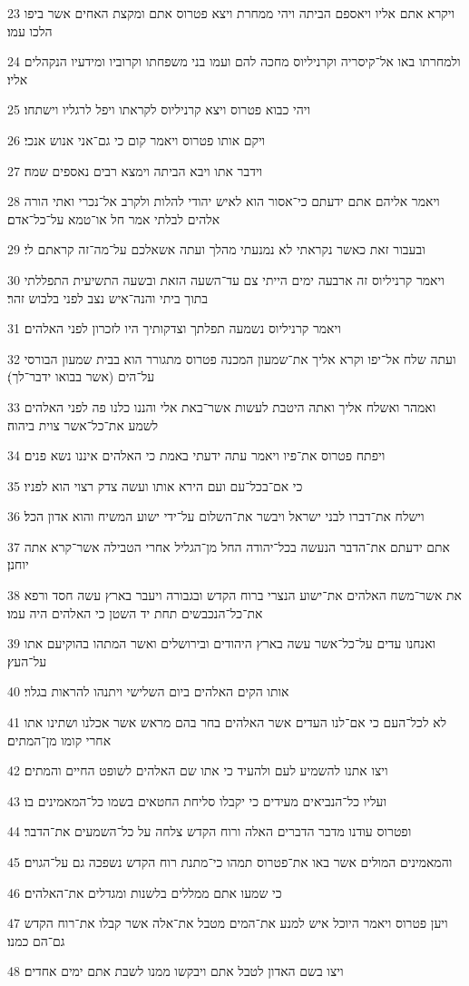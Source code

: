 \par 23 ויקרא אתם אליו ויאספם הביתה ויהי ממחרת ויצא פטרוס אתם ומקצת האחים אשר ביפו הלכו עמו׃
\par 24 ולמחרתו באו אל־קיסריה וקרניליוס מחכה להם ועמו בני משפחתו וקרוביו ומידעיו הנקהלים אליו׃
\par 25 ויהי כבוא פטרוס ויצא קרניליוס לקראתו ויפל לרגליו וישתחו׃
\par 26 ויקם אותו פטרוס ויאמר קום כי גם־אני אנוש אנכי׃
\par 27 וידבר אתו ויבא הביתה וימצא רבים נאספים שמה׃
\par 28 ויאמר אליהם אתם ידעתם כי־אסור הוא לאיש יהודי להלות ולקרב אל־נכרי ואתי הורה אלהים לבלתי אמר חל או־טמא על־כל־אדם׃
\par 29 ובעבור זאת כאשר נקראתי לא נמנעתי מהלך ועתה אשאלכם על־מה־זה קראתם לי׃
\par 30 ויאמר קרניליוס זה ארבעה ימים הייתי צם עד־השעה הזאת ובשעה התשיעית התפללתי בתוך ביתי והנה־איש נצב לפני בלבוש זהר׃
\par 31 ויאמר קרניליוס נשמעה תפלתך וצדקותיך היו לזכרון לפני האלהים׃
\par 32 ועתה שלח אל־יפו וקרא אליך את־שמעון המכנה פטרוס מתגורר הוא בבית שמעון הבורסי על־הים (אשר בבואו ידבר־לך)׃
\par 33 ואמהר ואשלח אליך ואתה היטבת לעשות אשר־באת אלי והננו כלנו פה לפני האלהים לשמע את־כל־אשר צוית ביהוה׃
\par 34 ויפתח פטרוס את־פיו ויאמר עתה ידעתי באמת כי האלהים איננו נשא פנים׃
\par 35 כי אם־בכל־עם ועם הירא אותו ועשה צדק רצוי הוא לפניו׃
\par 36 וישלח את־דברו לבני ישראל ויבשר את־השלום על־ידי ישוע המשיח והוא אדון הכל׃
\par 37 אתם ידעתם את־הדבר הנעשה בכל־יהודה החל מן־הגליל אחרי הטבילה אשר־קרא אתה יוחנן׃
\par 38 את אשר־משח האלהים את־ישוע הנצרי ברוח הקדש ובגבורה ויעבר בארץ עשה חסד ורפא את־כל־הנכבשים תחת יד השטן כי האלהים היה עמו׃
\par 39 ואנחנו עדים על־כל־אשר עשה בארץ היהודים ובירושלים ואשר המתהו בהוקיעם אתו על־העץ׃
\par 40 אותו הקים האלהים ביום השלישי ויתנהו להראות בגלוי׃
\par 41 לא לכל־העם כי אם־לנו העדים אשר האלהים בחר בהם מראש אשר אכלנו ושתינו אתו אחרי קומו מן־המתים׃
\par 42 ויצו אתנו להשמיע לעם ולהעיד כי אתו שם האלהים לשופט החיים והמתים׃
\par 43 ועליו כל־הנביאים מעידים כי יקבלו סליחת החטאים בשמו כל־המאמינים בו׃
\par 44 ופטרוס עודנו מדבר הדברים האלה ורוח הקדש צלחה על כל־השמעים את־הדבר׃
\par 45 והמאמינים המולים אשר באו את־פטרוס תמהו כי־מתנת רוח הקדש נשפכה גם על־הגוים׃
\par 46 כי שמעו אתם ממללים בלשנות ומגדלים את־האלהים׃
\par 47 ויען פטרוס ויאמר היוכל איש למנע את־המים מטבל את־אלה אשר קבלו את־רוח הקדש גם־הם כמנו׃
\par 48 ויצו בשם האדון לטבל אתם ויבקשו ממנו לשבת אתם ימים אחדים׃

